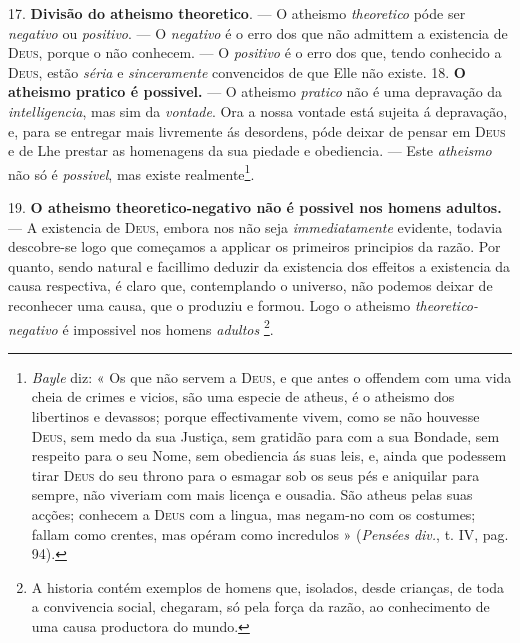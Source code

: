 17. \textbf{Divisão do atheismo theoretico}. --- O atheismo \emph{theoretico} póde ser \emph{negativo} ou \emph{positivo}. --- O \emph{negativo} é o erro dos que não admittem a existencia de \textsc{Deus}, porque o não conhecem. --- O \emph{positivo} é o erro dos que, tendo conhecido a \textsc{Deus}, estão \emph{séria} e \emph{sinceramente} convencidos de que Elle não existe.
 18. \textbf{O atheismo pratico é possivel.} --- O atheismo \emph{pratico} não é uma depravação da \emph{intelligencia}, mas sim da \emph{vontade}. Ora a nossa vontade está sujeita á depravação, e, para se entregar mais livremente ás desordens, póde deixar de pensar em \textsc{Deus} e de Lhe prestar as homenagens da sua piedade e obediencia. --- Este \emph{atheismo} não só é \emph{possivel}, mas existe realmente\footnote{\emph{Bayle} diz: « Os que não servem a \textsc{Deus}, e que antes o offendem com uma vida cheia de crimes e vicios, são uma especie de atheus, é o atheismo dos libertinos e devassos; porque effectivamente vivem, como se não houvesse \textsc{Deus}, sem medo da sua Justiça, sem gratidão para com a sua Bondade, sem respeito para o seu Nome, sem obediencia ás suas leis, e, ainda que podessem tirar \textsc{Deus} do seu throno para o esmagar sob os seus pés e aniquilar para sempre, não viveriam com mais licença e ousadia. São atheus pelas suas acções; conhecem a \textsc{Deus} com a lingua, mas negam-no com os costumes; fallam como crentes, mas opéram como incredulos » (\emph{Pensées div.}, t. IV, pag. 94).}.

19. \textbf{O atheismo theoretico-negativo não é possivel nos homens adultos.} --- A existencia de \textsc{Deus}, embora nos não seja \emph{immediatamente} evidente, todavia descobre-se logo que começamos a applicar os primeiros principios da razão. Por quanto, sendo natural e facillimo deduzir da existencia dos effeitos a existencia da causa respectiva, é claro que, contemplando o universo, não podemos deixar de reconhecer uma causa, que o  produziu e formou. Logo o atheismo \emph{theoretico-negativo} é impossivel nos homens \emph{adultos} \footnote{A historia contém exemplos de homens que, isolados, desde crianças, de toda a convivencia social, chegaram, só pela força da razão, ao conhecimento de uma causa productora do mundo.}.

